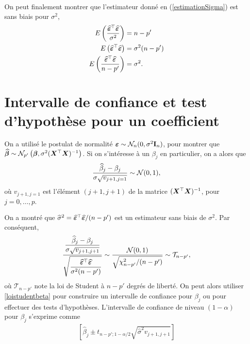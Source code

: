On peut finalement montrer que l'estimateur donné en (\ref{estimationSigma}) est sans biais pour $\sigma^2$,
\begin{align*}
E \left( \frac{\widehat{\bm\varepsilon}^\top\widehat{\bm\varepsilon}}{\sigma^2} \right) &= n-p' \\
E \left( \widehat{\bm\varepsilon}^\top\widehat{\bm\varepsilon} \right) &= \sigma^2 (n-p') \\
E \left( \frac{\widehat{\bm\varepsilon}^\top\widehat{\bm\varepsilon}}{n-p'} \right) &= \sigma^2.
\end{align*}


\section{Intervalle de confiance et test d'hypothèse pour un coefficient}
\label{sec:infbetaRLM}

On a utilisé le postulat de normalité $\bm\varepsilon \sim \mathcal{N}_n(0,\sigma^2\bold{I}_n)$, pour montrer que $\widehat{\bm\beta} \sim \mathcal{N}_{p'}\left(\bm\beta,\sigma^2 (\bm{X}^\top\bm{X})^{-1}\right)$. Si on s'intéresse à un $\beta_j$ en particulier, on a alors que
\begin{eqnarray*}
	\frac{\widehat{\beta}_j-\beta_j}{\sigma \sqrt{v_{j+1,j=1}}} \sim \mathcal{N}(0,1),
\end{eqnarray*}
où $v_{j+1,j=1}$ est l'élément $(j+1,j+1)$ de la matrice $(\bm{X}^\top\bm{X})^{-1}$, pour $j=0, \dots, p$.

On a montré que $\widehat{\sigma}^2 = \widehat{\bm\varepsilon}^\top\widehat{\bm\varepsilon} / (n-p')$ est un estimateur sans biais de $\sigma^2$. Par conséquent,
\begin{eqnarray}
	\frac{\displaystyle\frac{\widehat{\beta}_j-\beta_j}{\sigma \sqrt{v_{j+1,j+1}}}}{\displaystyle\sqrt{\frac{\widehat{\bm\varepsilon}^\top\widehat{\bm\varepsilon}}{\sigma^2(n-p')}}} \sim \frac{\mathcal{N}(0,1)}{\sqrt{\chi^2_{n-p'}/(n-p')}} \sim \mathcal{T}_{n-p'},
	\label{loistudentbeta}
\end{eqnarray}
où $\mathcal{T}_{n-p'}$ note la loi de Student à $n-p'$ degrés de liberté. On peut alors utiliser \eqref{loistudentbeta} pour construire un intervalle de confiance pour $\beta_j$ ou pour effectuer des tests d'hypothèses.
L'intervalle de confiance de niveau $(1-\alpha)$ pour $\beta_j$ s'exprime comme
\begin{eqnarray}
\left[ \widehat\beta_j\pm t_{n-p';1-\alpha/2}\sqrt{\widehat\sigma^2 v_{j+1,j+1}} \right]
\label{intconf_beta}
\end{eqnarray}

